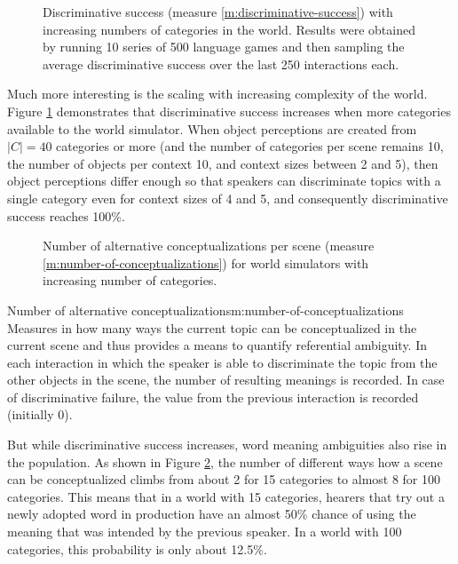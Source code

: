 \startfiguregroup

\begin{figure}[t]
  \caption{Discriminative success (measure
    \ref{m:discriminative-success}) with increasing numbers of
    categories in the world. Results were obtained by running 10
    series of 500 language games and then sampling the average
    discriminative success over the last 250 interactions each.}
  \label{f:number-of-attributes-vs-discriminative-success}
\end{figure}


\noindent Much more interesting is the scaling with increasing
complexity of the world. Figure
\ref{f:number-of-attributes-vs-discriminative-success} demonstrates
that discriminative success increases when more categories available
to the world simulator. When object perceptions are created from
$|C|=40$ categories or more (and the number of categories per scene
remains 10, the number of objects per context 10, and context sizes
between 2 and 5), then object perceptions differ enough so that
speakers can discriminate topics with a single category even for
context sizes of 4 and 5, and consequently discriminative success
reaches 100\%.

\begin{figure}[t]
  \caption{Number of alternative conceptualizations per scene (measure
    \ref{m:number-of-conceptualizations}) for world simulators with
    increasing number of categories.}
  \label{f:number-of-attributes-vs-number-of-conceptualizations}
\end{figure}

\stopfiguregroup

\begin{measure}[b]{Number of alternative
    conceptualizations}{m:number-of-conceptualizations}
  Measures in how many ways the current topic can be conceptualized in
  the current scene and thus provides a means to quantify referential
  ambiguity. In each interaction in which the speaker is able to
  discriminate the topic from the other objects in the scene, the
  number of resulting meanings is recorded. In case of discriminative
  failure, the value from the previous interaction is recorded
  (initially 0).
\end{measure}


But while discriminative success increases, word meaning ambiguities
also rise in the population. As shown in Figure
\ref{f:number-of-attributes-vs-number-of-conceptualizations}, the
number of different ways how a scene can be conceptualized climbs from
about 2 for 15 categories to almost 8 for 100 categories. This means
that in a world with 15 categories, hearers that try out a newly
adopted word in production have an almost 50\% chance of using the
meaning that was intended by the previous speaker. In a world with 100
categories, this probability is only about 12.5\%.


